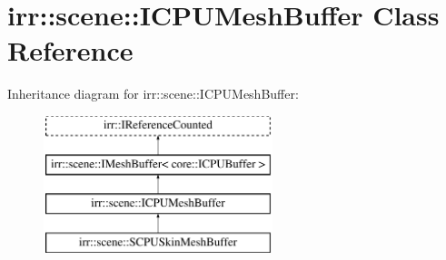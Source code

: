 \hypertarget{classirr_1_1scene_1_1ICPUMeshBuffer}{}\section{irr\+:\+:scene\+:\+:I\+C\+P\+U\+Mesh\+Buffer Class Reference}
\label{classirr_1_1scene_1_1ICPUMeshBuffer}
Inheritance diagram for irr\+:\+:scene\+:\+:I\+C\+P\+U\+Mesh\+Buffer\+:\begin{figure}[H]
\begin{center}
\leavevmode
\includegraphics[height=4.000000cm]{classirr_1_1scene_1_1ICPUMeshBuffer}
\end{center}
\end{figure}
